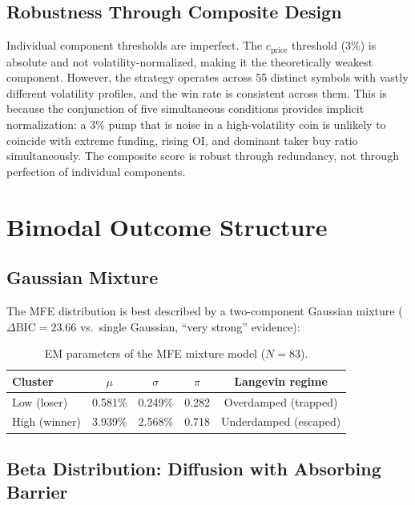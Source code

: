 \documentclass[11pt,a4paper]{article}
\begin{document}
\subsection{Robustness Through Composite Design}

Individual component thresholds are imperfect. The $c_{\text{price}}$ threshold (3\%) is absolute and not volatility-normalized, making it the theoretically weakest component. However, the strategy operates across 55 distinct symbols with vastly different volatility profiles, and the win rate is consistent across them. This is because the conjunction of five simultaneous conditions provides implicit normalization: a 3\% pump that is noise in a high-volatility coin is unlikely to coincide with extreme funding, rising OI, and dominant taker buy ratio simultaneously. The composite score is robust through redundancy, not through perfection of individual components.


\section{Bimodal Outcome Structure}
\label{sec:bimodality}

\subsection{Gaussian Mixture}

The MFE distribution is best described by a two-component Gaussian mixture ($\Delta\text{BIC} = 23.66$ vs.\ single Gaussian, ``very strong'' evidence):

\begin{table}[H]
\centering
\caption{EM parameters of the MFE mixture model ($N=83$).}
\begin{tabular}{lcccc}
\toprule
\textbf{Cluster} & $\mu$ & $\sigma$ & $\pi$ & \textbf{Langevin regime} \\
\midrule
Low (loser) & 0.581\% & 0.249\% & 0.282 & Overdamped (trapped) \\
High (winner) & 3.939\% & 2.568\% & 0.718 & Underdamped (escaped) \\
\bottomrule
\end{tabular}
\end{table}

\subsection{Beta Distribution: Diffusion with Absorbing Barrier}
\end{document}
